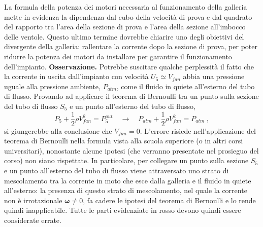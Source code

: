 La formula della potenza dei motori necessaria al funzionamento della galleria mette in evidenza la dipendenza dal cubo della velocità di prova e dal quadrato del rapporto tra l'area della sezione di prova e l'area della sezione all'imbocco delle ventole. Questo ultimo termine dovrebbe chiarire uno degli obiettivi del divergente della galleria: rallentare la corrente dopo la sezione di prova, per poter ridurre la potenza dei motori da installare per garantire il funzionamento dell'impianto.
%
\newline \noindent
\textbf{Osservazione.} Potrebbe suscitare qualche perplessità il fatto che la corrente in uscita dall'impianto con velocità $U_5 \simeq V_{fan}$ abbia una pressione uguale alla pressione ambiente, $P_{atm}$, come il fluido in quiete all'esterno del tubo di flusso. {\color{red} Provando ad applicare il teorema di Bernoulli} tra un punto sulla sezione del tubo di flusso $S_5$ e un punto all'esterno del tubo di flusso,
{\color{red}
\begin{equation}
 P_5 + \dfrac{1}{2}\rho V_{fan}^2 = P_5^{out}
 \quad \rightarrow \quad 
 P_{atm} + \dfrac{1}{2}\rho V_{fan}^2 = P_{atm} \ ,
\end{equation}
}
si giungerebbe alla conclusione che {\color{red} $V_{fan} = 0$}. L'errore risiede nell'applicazione del teorema di Bernoulli nella formula vista alla scuola superiore (o in altri corsi universitari), nonostante alcune ipotesi (che verranno presentate nel prosieguo del corso) non siano rispettate. In particolare, per collegare un punto sulla sezione $S_5$ e un punto all'esterno del tubo di flusso viene attraversato uno strato di mescolamento tra la corrente in moto che esce dalla galleria e il fluido in quiete all'esterno: la presenza di questo strato di mescolamento, nel quale la corrente non è irrotazionale $\bm{\omega} \neq 0$, fa cadere le ipotesi del teorema di Bernoulli e lo rende quindi inapplicabile. Tutte {\color{red}le parti evidenziate in rosso devono quindi essere considerate errate}.

